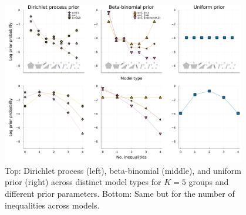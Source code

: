 \documentclass[11pt,a4paper]{article}
\theoremstyle{definition} %
\theoremstyle{case}
\newcommand{\FD}[1]{\textcolor{red}{Fabian: #1 }}
\begin{document}

\begin{figure}
    \centering
    \includegraphics[width = 0.95\textwidth]{visualizePriors_2x3_new.pdf}
    \caption{Top: Dirichlet process (left), beta-binomial (middle), and uniform prior (right) across distinct model types for $K = 5$ groups and different prior parameters. Bottom: Same but for the number of inequalities across models.
    } %
    \label{fig:prior-comparison}
\end{figure}
\end{document}

